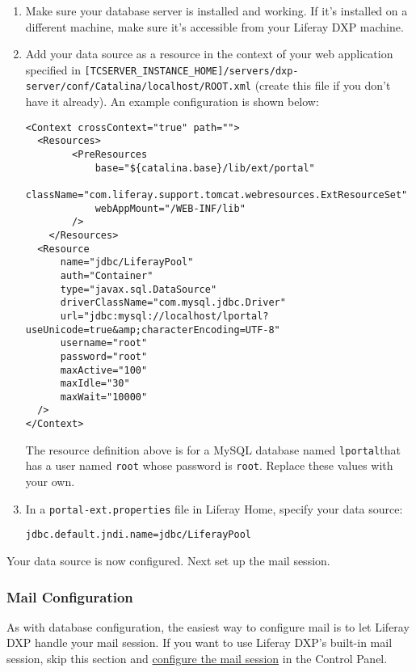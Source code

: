 \begin{enumerate}
\def\labelenumi{\arabic{enumi}.}
\item
  Make sure your database server is installed and working. If it's
  installed on a different machine, make sure it's accessible from your
  Liferay DXP machine.
\item
  Add your data source as a resource in the context of your web
  application specified in
  \texttt{{[}TCSERVER\_INSTANCE\_HOME{]}/servers/dxp-server/conf/Catalina/localhost/ROOT.xml}
  (create this file if you don't have it already). An example
  configuration is shown below:

\begin{verbatim}
<Context crossContext="true" path="">
  <Resources>
        <PreResources
            base="${catalina.base}/lib/ext/portal"
            className="com.liferay.support.tomcat.webresources.ExtResourceSet"
            webAppMount="/WEB-INF/lib"
        />
    </Resources>
  <Resource
      name="jdbc/LiferayPool"
      auth="Container"
      type="javax.sql.DataSource"
      driverClassName="com.mysql.jdbc.Driver"
      url="jdbc:mysql://localhost/lportal?useUnicode=true&amp;characterEncoding=UTF-8"
      username="root"
      password="root"
      maxActive="100"
      maxIdle="30"
      maxWait="10000"
  />
</Context>
\end{verbatim}

  The resource definition above is for a MySQL database named
  \texttt{lportal}that has a user named \texttt{root} whose password is
  \texttt{root}. Replace these values with your own.
\item
  In a \texttt{portal-ext.properties} file in Liferay Home, specify your
  data source:

\begin{verbatim}
jdbc.default.jndi.name=jdbc/LiferayPool
\end{verbatim}
\end{enumerate}

Your data source is now configured. Next set up the mail session.

\subsubsection{Mail Configuration}\label{mail-configuration-3}

As with database configuration, the easiest way to configure mail is to
let Liferay DXP handle your mail session. If you want to use Liferay
DXP's built-in mail session, skip this section and
\href{/docs/7-1/deploy/-/knowledge_base/d/installing-liferay\#configuring-mail}{configure
the mail session} in the Control Panel.

